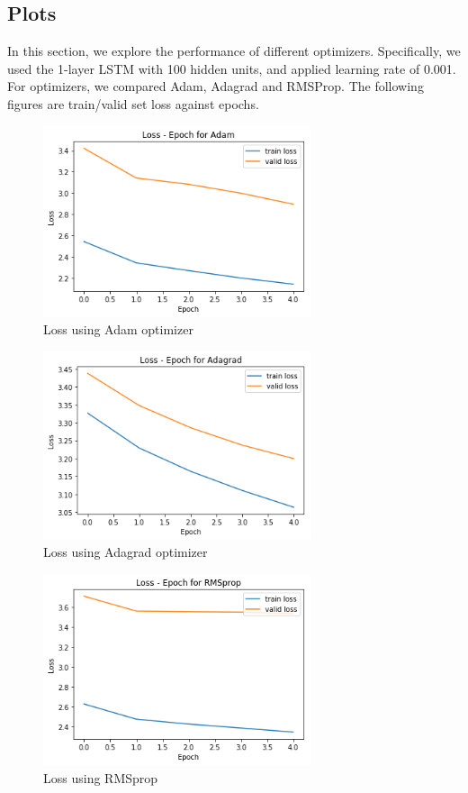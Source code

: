 \documentclass{article}
\begin{document}
\subsection{Plots}
In this section, we explore the performance of different optimizers. Specifically, we used the 1-layer LSTM with 100 hidden units, and applied learning rate of 0.001. For optimizers, we compared Adam, Adagrad and RMSProp. The following figures are train/valid set loss against epochs.
\begin{figure}[h]
\centering
\includegraphics[width=0.7\textwidth]{pics/Adam_loss.png}
\caption{Loss using Adam optimizer}
\end{figure}
\begin{figure}[h]
\centering
\includegraphics[width=0.7\textwidth]{pics/Adgrad_loss.png}
\caption{Loss using Adagrad optimizer}
\end{figure}
\begin{figure}[h]
\centering
\includegraphics[width=0.7\textwidth]{pics/RMSprop_loss.png}
\caption{Loss using RMSprop}
\end{figure}
\end{document}

